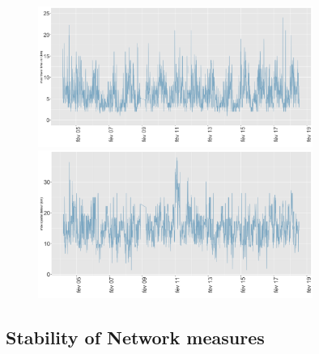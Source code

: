 \begin{figure}[t]\vspace*{4pt}
\centering
\centerline{\includegraphics[width=0.8\textwidth]{Figures/TransportationEquilibrium/gr31}}
\centerline{\includegraphics[width=0.8\textwidth]{Figures/TransportationEquilibrium/gr32}}
\caption{}
\label{fig:fig-3}
\end{figure}




\subsection{Stability of Network measures} %


